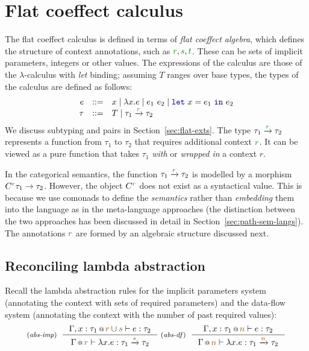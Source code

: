 \section{Flat coeffect calculus}
\label{sec:flat-calculus}

The flat coeffect calculus is defined in terms of \emph{flat coeffect algebra}, which defines
the structure of context annotations, such as $\cclrd{r}, \cclrd{s}, \cclrd{t}$. These can be
sets of implicit parameters, integers or other values. The expressions of the calculus are those
of the $\lambda$-calculus with \emph{let} binding; assuming $T$ ranges over base types, the 
types of the calculus are defined as follows:
%
\begin{equation*}
\begin{array}{rcl}
e &::=& x \sep \lambda x.e \sep e_1~e_2 \sep \kvd{let}~x = e_1~\kvd{in}~e_2\\
\tau &::=& T \sep \tau_1 \xrightarrow{\cclrd{r}} \tau_2
\end{array}
\end{equation*}
%
We discuss subtyping and pairs in Section~\ref{sec:flat-exts}. The type $\tau_1 \xrightarrow{\cclrd{r}} \tau_2$
represents a function from $\tau_1$ to $\tau_2$ that requires additional context $\cclrd{r}$.
It can be viewed as a pure function that takes $\tau_1$ \emph{with} or \emph{wrapped in} a 
context $r$. 

In the categorical semantics, the function $\tau_1 \xrightarrow{\cclrd{r}} \tau_2$ is modelled
by a morphism $C^{\cclrd{r}} \tau_1 \rightarrow \tau_2$. However, the object $C^{\cclrd{r}}$
does not exist as a syntactical value. This is because we use comonads to define the 
\emph{semantics} rather than \emph{embedding} them into the language as in the meta-language
approaches (the distinction between the two approaches has been discussed in detail in 
Section~\ref{sec:path-sem-langs}). The annotations $\cclrd{r}$ are formed by an algebraic
structure discussed next.


\subsection{Reconciling lambda abstraction}
\label{sec:flat-calculus-lambda}

Recall the lambda abstraction rules for the implicit parameters system (annotating the context
with sets of required parameters) and the data-flow system (annotating the context with the
number of past required values):
%
\begin{equation*}
\tyrule{abs-imp}
  {\coctx{\Gamma, x:\tau_1}{\aclrd{r} \cup \aclrd{s}} \vdash e : \tau_2}
  {\coctx{\Gamma}{\aclrd{r}} \vdash \lambda x.e : \tau_1 \xrightarrow{\aclrd{s}} \tau_2 }
\;
\tyrule{abs-df}
  {\coctx{\Gamma, x:\tau_1}{\aclrd{n}} \vdash e : \tau_2}
  {\coctx{\Gamma}{\aclrd{n}} \vdash \lambda x.e : \tau_1 \xrightarrow{\aclrd{n}} \tau_2 }
\end{equation*}

